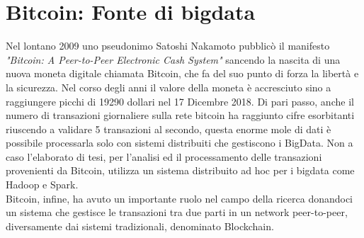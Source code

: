\chapter{Bitcoin: Fonte di bigdata}
\label{chap:bitcoin fonte di bigdata}

Nel lontano 2009 uno pseudonimo Satoshi Nakamoto pubblicò il manifesto \textit{"Bitcoin: A Peer-to-Peer Electronic Cash System"}\cite{bitcoin:white-paper} sancendo la nascita di una nuova moneta digitale chiamata Bitcoin, che fa  del suo punto di forza la libertà e la sicurezza. Nel corso degli anni il valore della moneta è accresciuto sino a raggiungere picchi di 19290 dollari nel 17 Dicembre 2018\cite{blockchain.com:valueOf}. Di pari passo, anche il numero di transazioni giornaliere sulla rete bitcoin ha raggiunto cifre esorbitanti riuscendo a validare 5 transazioni al secondo\cite{blockchain.com:transactions}, questa enorme mole di dati è possibile processarla solo con sistemi distribuiti che gestiscono i BigData. Non a caso l'elaborato di tesi, per l'analisi ed il processamento delle transazioni provenienti da Bitcoin, utilizza un sistema distribuito ad hoc per i bigdata come Hadoop e Spark.
\\Bitcoin, infine, ha avuto un importante ruolo nel campo della ricerca donandoci un sistema che gestisce le transazioni tra due parti in un network peer-to-peer, diversamente dai sistemi tradizionali, denominato Blockchain.




